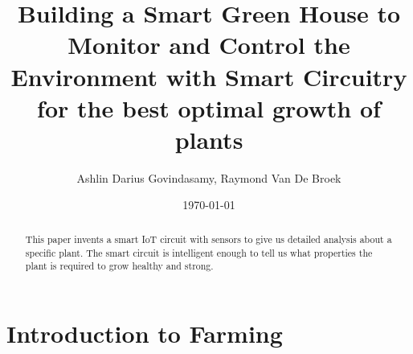 \documentclass{report}
\title{Building a Smart Green House to Monitor and Control the Environment with Smart Circuitry for the best optimal growth of plants}
\author{Ashlin Darius Govindasamy, Raymond Van De Broek}
\date{\today}
\begin{document}
\maketitle
\newpage


\begin{abstract}
This paper invents a smart IoT circuit with sensors to give us detailed analysis about a specific plant. The smart circuit is intelligent enough to tell us what properties the plant is required to grow healthy and strong.
\end{abstract}



\tableofcontents


\chapter{Introduction to Farming}


\newpage
\end{document}
